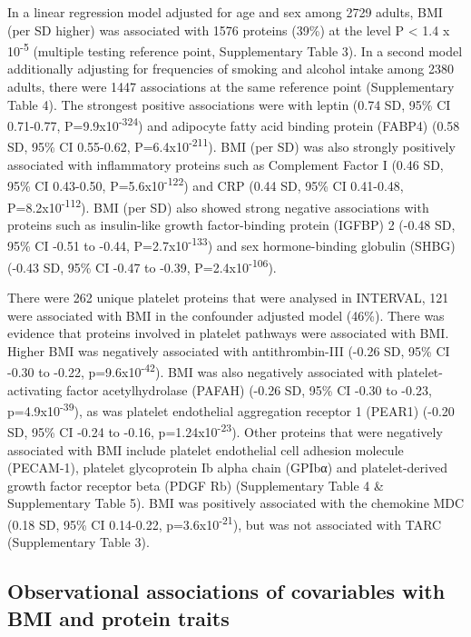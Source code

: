 \documentclass[11pt,twoside]{bristolthesis}
\begin{document}
In a linear regression model adjusted for age and sex among 2729 adults, BMI (per SD higher) was associated with 1576 proteins (39\%) at the level P \textless{} 1.4 x 10\textsuperscript{-5} (multiple testing reference point, Supplementary Table 3). In a second model additionally adjusting for frequencies of smoking and alcohol intake among 2380 adults, there were 1447 associations at the same reference point (Supplementary Table 4). The strongest positive associations were with leptin (0.74 SD, 95\% CI 0.71-0.77, P=9.9x10\textsuperscript{-324}) and adipocyte fatty acid binding protein (FABP4) (0.58 SD, 95\% CI 0.55-0.62, P=6.4x10\textsuperscript{-211}). BMI (per SD) was also strongly positively associated with inflammatory proteins such as Complement Factor I (0.46 SD, 95\% CI 0.43-0.50, P=5.6x10\textsuperscript{-122}) and CRP (0.44 SD, 95\% CI 0.41-0.48, P=8.2x10\textsuperscript{-112}). BMI (per SD) also showed strong negative associations with proteins such as insulin-like growth factor-binding protein (IGFBP) 2 (-0.48 SD, 95\% CI -0.51 to -0.44, P=2.7x10\textsuperscript{-133}) and sex hormone-binding globulin (SHBG) (-0.43 SD, 95\% CI -0.47 to -0.39, P=2.4x10\textsuperscript{-106}).

There were 262 unique platelet proteins that were analysed in INTERVAL, 121 were associated with BMI in the confounder adjusted model (46\%). There was evidence that proteins involved in platelet pathways were associated with BMI. Higher BMI was negatively associated with antithrombin-III (-0.26 SD, 95\% CI -0.30 to -0.22, p=9.6x10\textsuperscript{-42}). BMI was also negatively associated with platelet-activating factor acetylhydrolase (PAFAH) (-0.26 SD, 95\% CI -0.30 to -0.23, p=4.9x10\textsuperscript{-39}), as was platelet endothelial aggregation receptor 1 (PEAR1) (-0.20 SD, 95\% CI -0.24 to -0.16, p=1.24x10\textsuperscript{-23}). Other proteins that were negatively associated with BMI include platelet endothelial cell adhesion molecule (PECAM-1), platelet glycoprotein Ib alpha chain (GPIbα) and platelet-derived growth factor receptor beta (PDGF Rb) (Supplementary Table 4 \& Supplementary Table 5). BMI was positively associated with the chemokine MDC (0.18 SD, 95\% CI 0.14-0.22, p=3.6x10\textsuperscript{-21}), but was not associated with TARC (Supplementary Table 3).

\hypertarget{observational-associations-of-covariables-with-bmi-and-protein-traits}{%
\subsection{Observational associations of covariables with BMI and protein traits}\label{observational-associations-of-covariables-with-bmi-and-protein-traits}}
\end{document}
